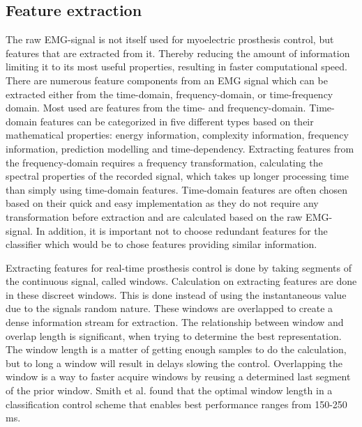 \subsection{Feature extraction} \label{sub:fe}

The raw EMG-signal is not itself used for myoelectric prosthesis control, but features that are extracted from it. Thereby reducing the amount of information limiting it to its most useful properties, resulting in faster computational speed. 
There are numerous feature components from an EMG signal which can be extracted either from the time-domain, frequency-domain, or time-frequency domain. Most used are features from the time- and frequency-domain. Time-domain features can be categorized in five different types based on their mathematical properties: energy information, complexity information, frequency information, prediction modelling and time-dependency. Extracting features from the frequency-domain requires a frequency transformation, calculating the spectral properties of the recorded signal, which takes up longer processing time than simply using time-domain features. 
Time-domain features are often chosen based on their quick and easy implementation as they do not require any transformation before extraction and are calculated based on the raw EMG-signal. In addition, it is important not to choose redundant features for the classifier which would be to chose features providing similar information. \cite{Phiny2012} 

Extracting features for real-time prosthesis control is done by taking segments of the continuous signal, called windows. Calculation on extracting features are done in these discreet windows. This is done instead of using the instantaneous value due to the signals random nature. These windows are overlapped to create a dense information stream for extraction. The relationship between window and overlap length is significant, when trying to determine the best representation. The window length is a matter of getting enough samples to do the calculation, but to long a window will result in delays slowing the control. Overlapping the window is a way to faster acquire windows by reusing a determined last segment of the prior window. Smith et al. found that the optimal window length in a classification control scheme that enables best performance ranges from 150-250 ms. \cite{Smith2014}
